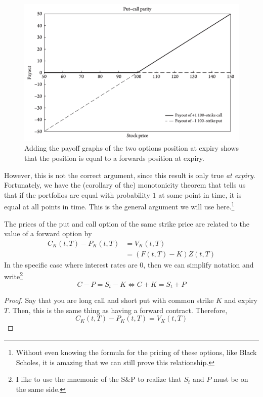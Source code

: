 \documentclass{article}
\begin{document}
    \begin{figure}[H]
      \centering 
      \includegraphics[scale=0.32]{img/put_call_parity.png}
      \caption{Adding the payoff graphs of the two options position at expiry shows that the position is equal to a forwards position at expiry. } 
      \label{fig:put_call_parity}
    \end{figure}

    However, this is not the correct argument, since this result is only true \textit{at expiry}. Fortunately, we have the (corollary of the) monotonicity theorem that tells us that if the portfolios are equal with probability $1$ at some point in time, it is equal at all points in time. This is the general argument we will use here.\footnote{Without even knowing the formula for the pricing of these options, like Black Scholes, it is amazing that we can still prove this relationship. } 

    \begin{lemma}
      The prices of the put and call option of the same strike price are related to the value of a forward option by 
      \begin{align}
        C_K (t, T) - P_K (t, T) & = V_K (t, T) \\ 
                                & = (F(t, T) - K) Z(t, T)
      \end{align}
      In the specific case where interest rates are $0$, then we can simplify notation and write\footnote{I like to use the mnemonic of the S\&P to realize that $S_t$ and $P$ must be on the same side.}
      \begin{equation}
        C - P = S_t - K \iff C + K = S_t + P 
      \end{equation}
    \end{lemma}
    \begin{proof}
      Say that you are long call and short put with common strike $K$ and expiry $T$. Then, this is the same thing as having a forward contract. Therefore, 
      \begin{equation}
        C_K (t, T) - P_K (t, T) = V_K (t, T)
      \end{equation}
    \end{proof}
\end{document}
